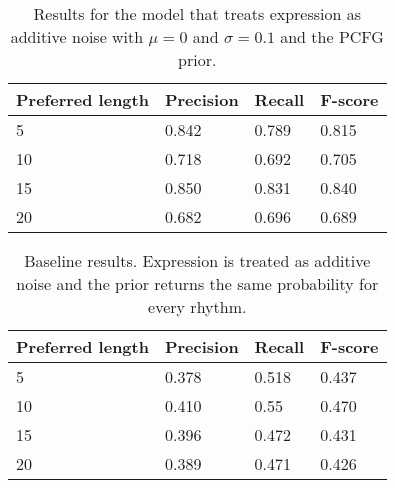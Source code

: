 \begin{table}
\centering
\caption{Results for the model that treats expression as additive noise with $\mu = 0$ and $\sigma = 0.1$ and the PCFG prior.}
\label{tab:results2}
\begin{tabular}{llll}
\hline
\textbf{Preferred length} & \textbf{Precision} & \textbf{Recall} & \textbf{F-score}\\
\hline
\hline
5 & 0.842 & 0.789 & 0.815\\
10 & 0.718 & 0.692 & 0.705\\
15 & 0.850 & 0.831 & 0.840\\
20 & 0.682 & 0.696 & 0.689\\
\hline
\end{tabular}
\end{table}

\begin{table}
\centering
\caption{Baseline results. Expression is treated as additive noise and the prior returns the same probability for every rhythm.}
\label{tab:results3}
\begin{tabular}{llll}
\hline
\textbf{Preferred length} & \textbf{Precision} & \textbf{Recall} & \textbf{F-score}\\
\hline
\hline
5 & 0.378 & 0.518 & 0.437\\
10 & 0.410 & 0.55 & 0.470\\
15 & 0.396 & 0.472 & 0.431\\
20 & 0.389 & 0.471 & 0.426\\
\hline
\end{tabular}
\end{table}